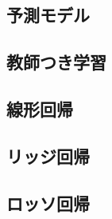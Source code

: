 \subsection{予測モデル}

\subsection{教師つき学習}

\subsection{線形回帰}

\subsection{リッジ回帰}

\subsection{ロッソ回帰}

